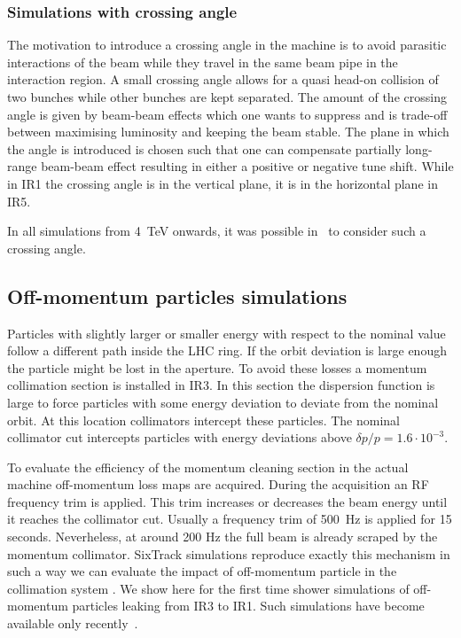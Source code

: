 \subsubsection{Simulations with crossing angle}
The motivation to introduce a crossing angle in the machine is to avoid parasitic interactions of the beam while they travel in the same beam pipe in the interaction region. A small crossing angle allows for a quasi head-on collision of two bunches while other bunches are kept separated. The amount of the crossing angle is given by beam-beam effects which one wants to suppress and is trade-off between maximising luminosity and keeping the beam stable. The plane in which the angle is introduced is chosen such that one can compensate partially long-range beam-beam effect resulting in either a positive or negative tune shift. While in IR1 the crossing angle is in the vertical plane, it is in the horizontal plane in IR5.

In all simulations from 4~TeV onwards, it was possible in \fluka~to consider such a crossing angle.

\subsection{Off-momentum particles simulations}
Particles with slightly larger or smaller energy with respect to the nominal value follow a different path inside the LHC ring. If the orbit deviation is large enough the particle might be lost in the aperture. To avoid these losses a momentum collimation section is installed in IR3. In this section the dispersion function is large to force particles with some energy deviation to deviate from the nominal orbit. At this location collimators intercept these particles. The nominal collimator cut intercepts particles with energy deviations above $\delta p/p = 1.6\cdot 10^{-3}$.

To evaluate the efficiency of the momentum cleaning section in the actual machine off-momentum loss maps are acquired. During the acquisition an RF frequency trim is applied. This trim increases or decreases the beam energy until it reaches the collimator cut. Usually a frequency trim of 500~Hz is applied for 15 seconds. Neverheless, at around 200 Hz the full beam is already scraped by the momentum collimator. SixTrack simulations reproduce exactly this mechanism in such a way we can evaluate the impact of off-momentum particle in the collimation system .
We show here for the first time shower simulations of off-momentum particles leaking from IR3 to IR1. Such simulations have become available only recently~\cite{HectorsPaper}. %


